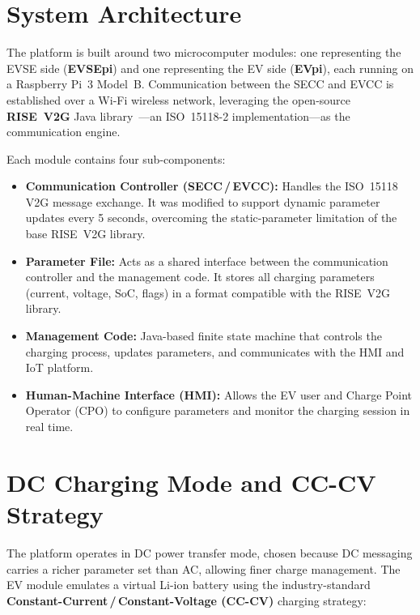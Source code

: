 \documentclass[12pt,a4paper]{report}
\begin{document}
\section{System Architecture}

The platform is built around two microcomputer modules: one representing the EVSE side
(\textbf{EVSEpi}) and one representing the EV side (\textbf{EVpi}), each running on a Raspberry
Pi~3 Model~B. Communication between the SECC and EVCC is established over a Wi-Fi wireless
network, leveraging the open-source \textbf{RISE~V2G} Java library~\autocite{rise_v2g}---an
ISO~15118-2 implementation---as the communication engine.

Each module contains four sub-components:

\begin{itemize}
  \item \textbf{Communication Controller (SECC\,/\,EVCC):} Handles the ISO~15118 V2G message
        exchange. It was modified to support dynamic parameter updates every 5 seconds, overcoming
        the static-parameter limitation of the base RISE~V2G library.

  \item \textbf{Parameter File:} Acts as a shared interface between the communication controller
        and the management code. It stores all charging parameters (current, voltage, SoC, flags)
        in a format compatible with the RISE~V2G library.

  \item \textbf{Management Code:} Java-based finite state machine that controls the charging
        process, updates parameters, and communicates with the HMI and IoT platform.

  \item \textbf{Human-Machine Interface (HMI):} Allows the EV user and Charge Point Operator
        (CPO) to configure parameters and monitor the charging session in real time.
\end{itemize}

\section{DC Charging Mode and CC-CV Strategy}

The platform operates in DC power transfer mode, chosen because DC messaging carries a richer
parameter set than AC, allowing finer charge management. The EV module emulates a virtual Li-ion
battery using the industry-standard \textbf{Constant-Current\,/\,Constant-Voltage (CC-CV)}
charging strategy:
\end{document}
